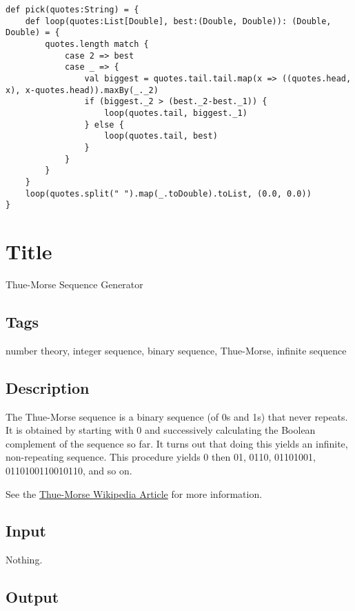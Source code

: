 \begin{verbatim}
def pick(quotes:String) = {
    def loop(quotes:List[Double], best:(Double, Double)): (Double, Double) = {
        quotes.length match {
            case 2 => best
            case _ => {
                val biggest = quotes.tail.tail.map(x => ((quotes.head, x), x-quotes.head)).maxBy(_._2)
                if (biggest._2 > (best._2-best._1)) {
                    loop(quotes.tail, biggest._1)
                } else {
                    loop(quotes.tail, best)
                }
            }
        }
    }
    loop(quotes.split(" ").map(_.toDouble).toList, (0.0, 0.0))
}
\end{verbatim}

\section{Title}\label{title-10}

Thue-Morse Sequence Generator

\subsection{Tags}\label{tags-10}

number theory, integer sequence, binary sequence, Thue-Morse, infinite
sequence

\subsection{Description}\label{description-10}

The Thue-Morse sequence is a binary sequence (of 0s and 1s) that never
repeats. It is obtained by starting with 0 and successively calculating
the Boolean complement of the sequence so far. It turns out that doing
this yields an infinite, non-repeating sequence. This procedure yields 0
then 01, 0110, 01101001, 0110100110010110, and so on.

See the
\href{http://en.wikipedia.org/wiki/Thue\%E2\%80\%93Morse_sequence}{Thue-Morse
Wikipedia Article} for more information.

\subsection{Input}\label{input}

Nothing.

\subsection{Output}\label{output}

